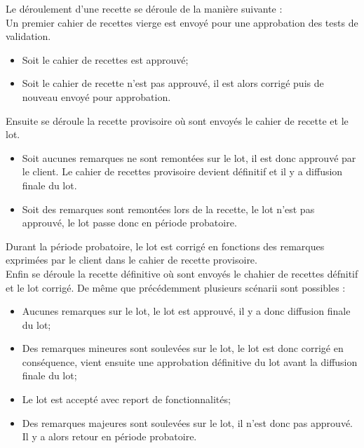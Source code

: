 Le déroulement d'une recette se déroule de la manière suivante : \\
Un premier cahier de recettes vierge est envoyé pour une approbation des tests de validation.
\begin{itemize}
	\item Soit le cahier de recettes est approuvé;
	\item Soit le cahier de recette n'est pas approuvé, il est alors corrigé puis de nouveau envoyé pour approbation.
\end{itemize}
Ensuite se déroule la recette provisoire où sont envoyés le cahier de recette et le lot.
\begin{itemize}
	\item Soit aucunes remarques ne sont remontées sur le lot, il est donc approuvé par le client. Le cahier de recettes provisoire devient définitif et il y a diffusion finale du lot. 
	\item Soit des remarques sont remontées lors de la recette, le lot n'est pas approuvé, le lot passe donc en période probatoire.
\end{itemize}
Durant la période probatoire, le lot est corrigé en fonctions des remarques exprimées par le client dans le cahier de recette provisoire. \\
Enfin se déroule la recette définitive où sont envoyés le chahier de recettes défnitif et le lot corrigé. De même que précédemment plusieurs scénarii sont possibles :
\begin{itemize}
	\item Aucunes remarques sur le lot, le lot est approuvé, il y a donc diffusion finale du lot;
	\item Des remarques mineures sont soulevées sur le lot, le lot est donc corrigé en conséquence, vient ensuite une approbation définitive du lot avant la diffusion finale du lot;
	\item Le lot est accepté avec report de fonctionnalités;
	\item Des remarques majeures sont soulevées sur le lot, il n'est donc pas approuvé. Il y a alors retour en période probatoire.
\end{itemize}


